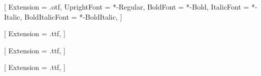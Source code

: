 \setmainfont{STIXTwoText}[
    Extension = .otf,
    UprightFont = *-Regular,
    BoldFont = *-Bold,
    ItalicFont = *-Italic,
    BoldItalicFont = *-BoldItalic,
]

[
    Extension = .ttf,
]

[
    Extension = .ttf,
]

[
    Extension = .ttf,
]
